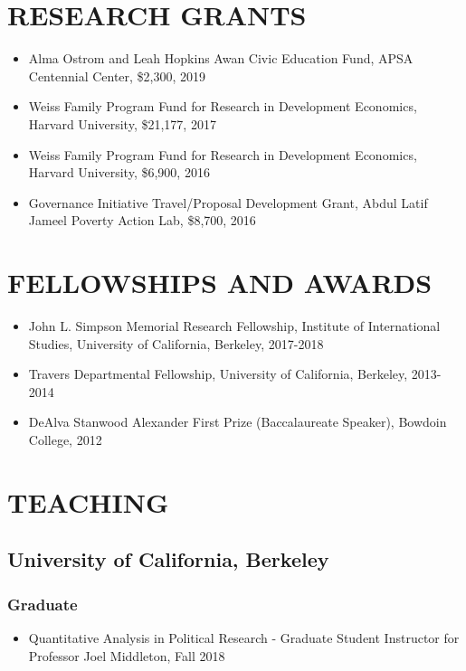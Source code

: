 \documentclass[11pt]{article}
\begin{document}
\section*{RESEARCH GRANTS}
\begin{itemize}
\item[]Alma Ostrom and Leah Hopkins Awan Civic Education Fund, APSA Centennial Center, \$2,300, 2019
\item[] Weiss Family Program Fund for Research in Development Economics, Harvard University, \$21,177, 2017
\item[] Weiss Family Program Fund for Research in Development Economics, Harvard University, \$6,900, 2016
\item[] Governance Initiative Travel/Proposal Development Grant, Abdul Latif Jameel Poverty Action Lab, \$8,700, 2016	
	 
	
\end{itemize}


\section*{FELLOWSHIPS AND AWARDS} 
\begin{itemize}
	\item[]John L. Simpson Memorial Research Fellowship, Institute of International Studies, University of California, Berkeley, 2017-2018
	\item[]Travers Departmental Fellowship, University of California, Berkeley, 2013-2014
	\item[]DeAlva Stanwood Alexander First Prize (Baccalaureate Speaker), Bowdoin College, 2012
\end{itemize}

\section*{TEACHING}


\subsection*{University of California, Berkeley}
\subsubsection*{Graduate}
\begin{itemize}
	\item[]Quantitative Analysis in Political Research - Graduate Student Instructor for Professor Joel Middleton, Fall 2018 
\end{itemize}
\end{document}
